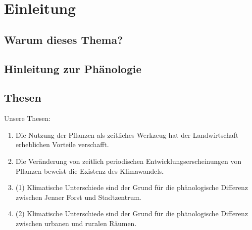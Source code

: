 \chapter{Einleitung}


\section{Warum dieses Thema?}
\section{Hinleitung zur Phänologie}
\section{Thesen}
Unsere Thesen:
\begin{enumerate}
    


    \item Die Nutzung der Pflanzen als zeitliches
    Werkzeug hat der Landwirtschaft erheblichen 
    Vorteile verschafft.
    

    \item Die Veränderung von zeitlich periodischen 
    Entwicklungserscheinungen von Pflanzen beweist 
    die Existenz des Klimawandels. 

    \item (1) Klimatische Unterschiede sind der Grund für die phänologische Differenz zwischen Jenaer Forst und Stadtzentrum.

    \item (2) Klimatische Unterschiede sind der Grund für die phänologische Differenz zwischen urbanen und ruralen Räumen.
    
\end{enumerate}

